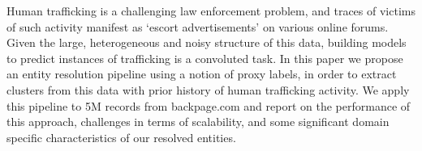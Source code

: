 Human trafficking is a challenging law enforcement problem, and traces of victims of such activity manifest as ‘escort advertisements' on various online forums. Given the large, heterogeneous and noisy structure of this data, building models to predict instances of trafficking is a convoluted task. In this paper we propose an entity resolution pipeline using a notion of proxy labels, in order to extract clusters from this data with prior history of human trafficking activity. We apply this pipeline to 5M records from backpage.com and report on the performance of this approach, challenges in terms of scalability, and some significant domain specific characteristics of our resolved entities.
